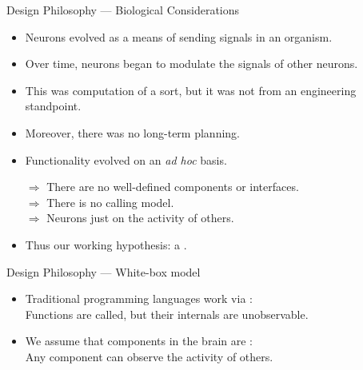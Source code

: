   \begin{frame}{Design Philosophy --- Biological Considerations}
      \begin{itemize}
         \item Neurons evolved as a means of sending signals in an organism.
         \medskip
         \item Over time, neurons began to modulate the signals of other neurons.
         \medskip
         \item This was computation of a sort, but it was not  from an engineering standpoint.
         \medskip
         \item Moreover, there was no long-term planning.
         \medskip
         \item Functionality evolved on an \emph{ad hoc} basis.\\
         
         \vspace{2mm}
         
         $\Rightarrow$ There are no well-defined components or interfaces.\\
         $\Rightarrow$ There is no calling model.\\
         $\Rightarrow$ Neurons just  on the activity of others.
         
         \pause
         \medskip
         \item Thus our working hypothesis: a .
      \end{itemize}
   \end{frame}
   
   \begin{frame}{Design Philosophy --- White-box model}
      \begin{itemize}
         \item Traditional programming languages work via :\\
         \vspace{2mm}
         Functions are called, but their internals are unobservable.
         \vspace{4mm}
         \item We assume that components in the brain are :\\
         \vspace{2mm}
         Any component can observe the activity of others.
      \end{itemize}
   \end{frame}
   
